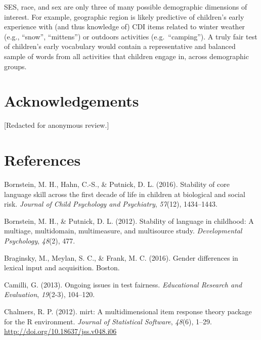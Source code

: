 \documentclass[10pt, letterpaper]{article}
\begin{document}
SES, race, and sex are only three of many possible demographic
dimensions of interest. For example, geographic region is likely
predictive of children's early experience with (and thus knowledge of)
CDI items related to winter weather (e.g., ``snow'', ``mittens'') or
outdoors activities (e.g.~``camping''). A truly fair test of children's
early vocabulary would contain a representative and balanced sample of
words from all activities that children engage in, across demographic
groups.

\hypertarget{acknowledgements}{%
\section{Acknowledgements}\label{acknowledgements}}

{[}Redacted for anonymous review.{]}

\hypertarget{references}{%
\section{References}\label{references}}

\setlength{\parindent}{-0.1in} 
\setlength{\leftskip}{0.125in}

\noindent

\hypertarget{refs}{}
\leavevmode\hypertarget{ref-bornstein2016stability}{}%
Bornstein, M. H., Hahn, C.-S., \& Putnick, D. L. (2016). Stability of
core language skill across the first decade of life in children at
biological and social risk. \emph{Journal of Child Psychology and
Psychiatry}, \emph{57}(12), 1434--1443.

\leavevmode\hypertarget{ref-bornstein2012stability}{}%
Bornstein, M. H., \& Putnick, D. L. (2012). Stability of language in
childhood: A multiage, multidomain, multimeasure, and multisource study.
\emph{Developmental Psychology}, \emph{48}(2), 477.

\leavevmode\hypertarget{ref-braginsky2016gender}{}%
Braginsky, M., Meylan, S. C., \& Frank, M. C. (2016). Gender differences
in lexical input and acquisition. Boston.

\leavevmode\hypertarget{ref-camilli2013ongoing}{}%
Camilli, G. (2013). Ongoing issues in test fairness. \emph{Educational
Research and Evaluation}, \emph{19}(2-3), 104--120.

\leavevmode\hypertarget{ref-R-mirt}{}%
Chalmers, R. P. (2012). mirt: A multidimensional item response theory
package for the R environment. \emph{Journal of Statistical Software},
\emph{48}(6), 1--29. \url{http://doi.org/10.18637/jss.v048.i06}
\end{document}
